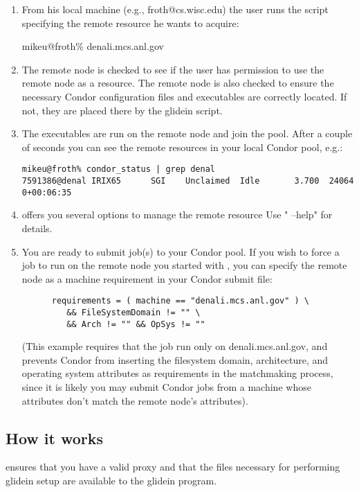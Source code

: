 \begin{enumerate}

\item From his local machine (e.g., froth@cs.wisc.edu) the user runs 
   the  script specifying the remote resource he wants 
   to acquire:

mikeu@froth\%  denali.mcs.anl.gov

\item The remote node is checked to see if the user has permission to
   use the remote node as a resource. The remote node is also checked
   to ensure the necessary Condor configuration files and executables
   are correctly located. If not, they are placed there by the glidein
   script.

\item The executables are run on the remote node and join the pool.
   After a couple of seconds you can see the remote resources in your 
   local Condor pool, e.g.:

\begin{verbatim}
mikeu@froth% condor_status | grep denal
7591386@denal IRIX65      SGI    Unclaimed  Idle       3.700  24064  0+00:06:35
\end{verbatim}

\item {} offers you several options to manage the remote resource
   Use " --help" for details.

\item You are ready to submit job(s) to your Condor pool. If you wish to force
   a job to run on the remote node you started with , you can
   specify the remote node as a machine requirement in your Condor submit
   file: 
\begin{verbatim}
      requirements = ( machine == "denali.mcs.anl.gov" ) \
         && FileSystemDomain != "" \
         && Arch != "" && OpSys != ""
\end{verbatim}
   (This example requires that the job run only on denali.mcs.anl.gov, and
   prevents Condor from inserting the filesystem domain, architecture, and 
   operating system attributes as requirements in the matchmaking process,
   since it is likely you may submit Condor jobs from a machine whose
   attributes don't match the remote node's attributes).

\end{enumerate}

\subsection{How it works}
 ensures that you have a valid proxy and that the files
necessary for performing glidein setup are available to the glidein
program. 

